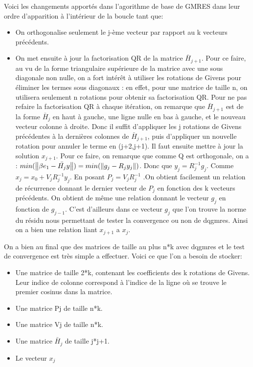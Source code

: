 Voici les changements apportés dans l'agorithme de base de GMRES dans leur ordre d'apparition à l'intérieur de la boucle tant que:
\begin{itemize}
\item On orthogonalise seulement le j-ème vecteur par rapport au k vecteurs précédents.
\item On met ensuite à jour la factorisation QR de la matrice \(\bar{H}_{j+1}\). Pour ce faire, au vu de la forme triangulaire supérieure de la matrice avec une sous diagonale non nulle, on a fort intérêt à utiliser les rotations de Givens pour éliminer les termes sous diagonaux : en effet, pour une matrice de taille n, on utilisera seulement n rotations pour obtenir sa factorisation QR. Pour ne pas refaire la factorisation QR à chaque itération, on remarque que  \(\bar{H}_{j+1}\) est de la forme \(\bar{H}_{j}\) en haut à gauche, une ligne nulle en bas à gauche, et le nouveau vecteur colonne à droite. Donc il suffit d'appliquer les j rotations de Givens précédentes à la dernières colonnes de  \(\bar{H}_{j+1}\), puis d'appliquer un nouvelle rotation pour annuler le terme en  (j+2,j+1). Il faut ensuite mettre à jour la solution \(x_{j+1}\). Pour ce faire, on remarque que comme Q est orthogonale, on a : \( min(\left\lVert\beta e_1-\bar{H_{j}} y\right\rVert) = min(\left\lVert g_{j}-R_{j}y_{j}\right\rVert)\). Donc que \(y_{j}=R_{j}^{-1}g_{j}\). Comme \(x_{j}=x_{0}+V_{j}R_{j}^{-1}y_{j}\). En posant \(P_{j}=V_{j}R_{j}^{-1}\) .On obtient facilement un relation de récurrence donnant le dernier vecteur de \(P_{j}\) en fonction des k vecteurs précédents. On obtient de même une relation donnant le vecteur $g_{j}$ en fonction de $g_{j-1}$. C'est d'ailleurs dans ce vecteur $g_{j}$ que l'on trouve la norme du résidu nous permettant de tester la convergence ou non de dqgmres. Ainsi on a bien une relation liant $x_{j+1}$ a $x_{j}$.
\end{itemize}
\newpage
On a bien au final que des matrices de taille au plus n*k avec dqgmres et le test de convergence est très simple a effectuer. Voici ce que l'on a besoin de stocker:
\begin{itemize}
\item Une matrice de taille 2*k, contenant les coefficients des k rotations de Givens. Leur indice de colonne correspond à l'indice de la ligne où se trouve le premier cosinus dans la matrice.
\item Une matrice Pj de taille n*k.
\item Une matrice Vj de taille n*k.
\item Une matrice \(\bar{H}_{j}\) de taille j*j+1.
\item Le vecteur $x_{j}$
\end{itemize}


